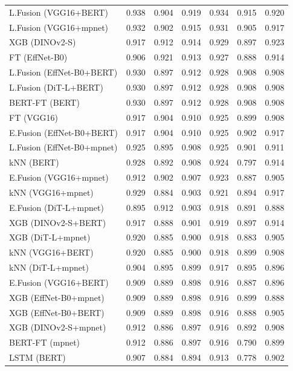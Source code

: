 \begin{longtable}{lrrrrrr}
L.Fusion (VGG16+BERT) & 0.938 & 0.904 & 0.919 & 0.934 & 0.915 & 0.920 \\
L.Fusion (VGG16+mpnet) & 0.932 & 0.902 & 0.915 & 0.931 & 0.905 & 0.917 \\
XGB (DINOv2-S) & 0.917 & 0.912 & 0.914 & 0.929 & 0.897 & 0.923 \\
FT (EffNet-B0) & 0.906 & 0.921 & 0.913 & 0.927 & 0.888 & 0.914 \\
L.Fusion (EffNet-B0+BERT) & 0.930 & 0.897 & 0.912 & 0.928 & 0.908 & 0.908 \\
L.Fusion (DiT-L+BERT) & 0.930 & 0.897 & 0.912 & 0.928 & 0.908 & 0.908 \\
BERT-FT (BERT) & 0.930 & 0.897 & 0.912 & 0.928 & 0.908 & 0.908 \\
FT (VGG16) & 0.917 & 0.904 & 0.910 & 0.925 & 0.899 & 0.908 \\
E.Fusion (EffNet-B0+BERT) & 0.917 & 0.904 & 0.910 & 0.925 & 0.902 & 0.917 \\
L.Fusion (EffNet-B0+mpnet) & 0.925 & 0.895 & 0.908 & 0.925 & 0.901 & 0.911 \\
kNN (BERT) & 0.928 & 0.892 & 0.908 & 0.924 & 0.797 & 0.914 \\
E.Fusion (VGG16+mpnet) & 0.912 & 0.902 & 0.907 & 0.923 & 0.887 & 0.905 \\
kNN (VGG16+mpnet) & 0.929 & 0.884 & 0.903 & 0.921 & 0.894 & 0.917 \\
E.Fusion (DiT-L+mpnet) & 0.895 & 0.912 & 0.903 & 0.918 & 0.891 & 0.888 \\
XGB (DINOv2-S+BERT) & 0.917 & 0.888 & 0.901 & 0.919 & 0.897 & 0.914 \\
XGB (DiT-L+mpnet) & 0.920 & 0.885 & 0.900 & 0.918 & 0.883 & 0.905 \\
kNN (VGG16+BERT) & 0.920 & 0.885 & 0.900 & 0.918 & 0.899 & 0.908 \\
kNN (DiT-L+mpnet) & 0.904 & 0.895 & 0.899 & 0.917 & 0.895 & 0.896 \\
E.Fusion (VGG16+BERT) & 0.909 & 0.889 & 0.898 & 0.916 & 0.887 & 0.896 \\
XGB (EffNet-B0+mpnet) & 0.909 & 0.889 & 0.898 & 0.916 & 0.899 & 0.888 \\
XGB (EffNet-B0+BERT) & 0.909 & 0.889 & 0.898 & 0.916 & 0.888 & 0.905 \\
XGB (DINOv2-S+mpnet) & 0.912 & 0.886 & 0.897 & 0.916 & 0.892 & 0.908 \\
BERT-FT (mpnet) & 0.912 & 0.886 & 0.897 & 0.916 & 0.790 & 0.899 \\
LSTM (BERT) & 0.907 & 0.884 & 0.894 & 0.913 & 0.778 & 0.902 \\

\end{longtable}
